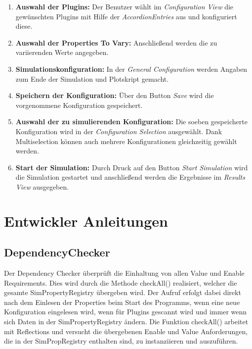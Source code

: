 \documentclass[a4paper, 11pt]{article} %
\begin{document}
\begin{enumerate}
\item \textbf{Auswahl der Plugins:} \newline Der Benutzer wählt im \emph{Configuration View} die gewünschten Plugins mit Hilfe der \emph{AccordionEntries} aus und konfiguriert diese.
\item \textbf{Auswahl der Properties To Vary:} \newline Anschließend werden die zu variierenden Werte angegeben.
\item \textbf{Simulationskonfiguration:} \newline In der \emph{General Configuration} werden Angaben zum Ende der Simulation und Plotskript gemacht.
\item \textbf{Speichern der Konfiguration:} \newline Über den Button \emph{Save} wird die vorgenommene Konfiguration gespeichert.
\item \textbf{Auswahl der zu simulierenden Konfiguration:} \newline Die soeben gespeicherte Konfiguration wird in der \emph{Configuration Selection} ausgewählt. Dank Multiselection können auch mehrere Konfigurationen gleichzeitig gewählt werden.
\item \textbf{Start der Simulation:} \newline Durch Druck auf den Button \emph{Start Simulation} wird die Simulation gestartet und anschließend werden die Ergebnisse im \emph{Results View} ausgegeben. 
\end{enumerate}

\section{Entwickler Anleitungen} %
\label{sec:entwicklung}
\subsection{DependencyChecker}
\label{ssub:dependencychecker}
Der Dependency Checker überprüft die Einhaltung von allen Value und Enable Requirements. Dies wird durch die Methode checkAll() realisiert, welcher die gesamte SimPropertyRegistry übergeben wird. Der Aufruf erfolgt dabei direkt nach dem Einlesen der Properties beim Start des Programms, wenn eine neue Konfiguration eingelesen wird, wenn für Plugins gescannt wird und immer wenn sich Daten in der SimPropertyRegistry ändern.
Die Funktion checkAll() arbeitet mit Reflections und versucht die übergebenen Enable und Value Anforderungen, die in der SimPropRegistry enthalten sind, zu instanziieren und auszuführen.\\
\end{document}
